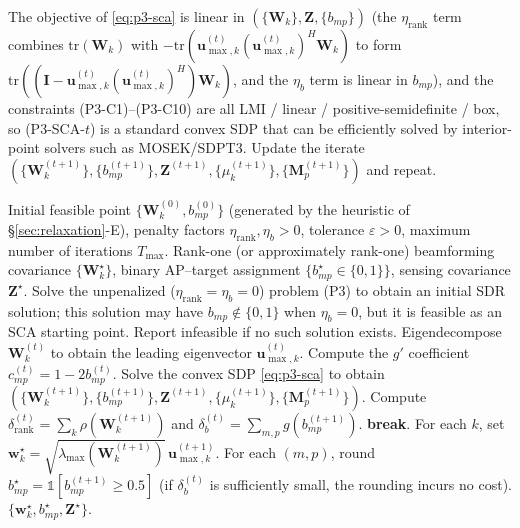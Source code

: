 \documentclass[12pt,a4paper]{article}
\newcommand{\vect}[1]{\mathbf{#1}}
\newcommand{\mat}[1]{\mathbf{#1}}
\newcommand{\tr}{\text{tr}}
\begin{document}
The objective of \eqref{eq:p3-sca} is linear in $(\{\mat{W}_k\}, \mat{Z}, \{b_{mp}\})$ (the $\eta_{\text{rank}}$ term combines $\tr(\mat{W}_k)$ with $-\tr(\vect{u}_{\max,k}^{(t)}(\vect{u}_{\max,k}^{(t)})^H \mat{W}_k)$ to form $\tr((\mat{I} - \vect{u}_{\max,k}^{(t)}(\vect{u}_{\max,k}^{(t)})^H) \mat{W}_k)$, and the $\eta_b$ term is linear in $b_{mp}$), and the constraints (P3-C1)--(P3-C10) are all LMI / linear / positive-semidefinite / box, so (P3-SCA-$t$) is a standard convex SDP that can be efficiently solved by interior-point solvers such as MOSEK/SDPT3. Update the iterate $(\{\mat{W}_k^{(t+1)}\}, \{b_{mp}^{(t+1)}\}, \mat{Z}^{(t+1)}, \{\mu_k^{(t+1)}\}, \{\mat{M}_p^{(t+1)}\})$ and repeat.

\begin{algorithm}[htbp]
\caption{Dual DC Penalty SCA Iteration (Joint Rank-One and Binary Recovery)}
\label{alg:sca-joint}
\begin{algorithmic}[1]
\Require Initial feasible point $\{\mat{W}_k^{(0)}, b_{mp}^{(0)}\}$ (generated by the heuristic of \S\ref{sec:relaxation}-E), penalty factors $\eta_{\text{rank}}, \eta_b > 0$, tolerance $\varepsilon > 0$, maximum number of iterations $T_{\max}$.
\Ensure Rank-one (or approximately rank-one) beamforming covariance $\{\mat{W}_k^\star\}$, binary AP--target assignment $\{b_{mp}^\star \in \{0,1\}\}$, sensing covariance $\mat{Z}^\star$.
\State Solve the unpenalized ($\eta_{\text{rank}} = \eta_b = 0$) problem (P3) to obtain an initial SDR solution; this solution may have $b_{mp} \notin \{0,1\}$ when $\eta_b = 0$, but it is feasible as an SCA starting point. Report infeasible if no such solution exists.
        \State Eigendecompose $\mat{W}_k^{(t)}$ to obtain the leading eigenvector $\vect{u}_{\max,k}^{(t)}$.
    \EndFor
        \State Compute the $g'$ coefficient $c_{mp}^{(t)} = 1 - 2 b_{mp}^{(t)}$.
    \EndFor
    \State Solve the convex SDP \eqref{eq:p3-sca} to obtain $(\{\mat{W}_k^{(t+1)}\}, \{b_{mp}^{(t+1)}\}, \mat{Z}^{(t+1)}, \{\mu_k^{(t+1)}\}, \{\mat{M}_p^{(t+1)}\})$.
    \State Compute $\delta_{\text{rank}}^{(t)} = \sum_k \rho(\mat{W}_k^{(t+1)})$ and $\delta_b^{(t)} = \sum_{m,p} g(b_{mp}^{(t+1)})$.
        \State \textbf{break}.
    \EndIf
\EndFor
\State For each $k$, set $\vect{w}_k^\star = \sqrt{\lambda_{\max}(\mat{W}_k^{(t+1)})} \, \vect{u}_{\max,k}^{(t+1)}$.
\State For each $(m, p)$, round $b_{mp}^\star = \mathbb{1}[b_{mp}^{(t+1)} \geq 0.5]$ (if $\delta_b^{(t)}$ is sufficiently small, the rounding incurs no cost).
\State \Return $\{\vect{w}_k^\star, b_{mp}^\star, \mat{Z}^\star\}$.
\end{algorithmic}
\end{algorithm}
\end{document}
